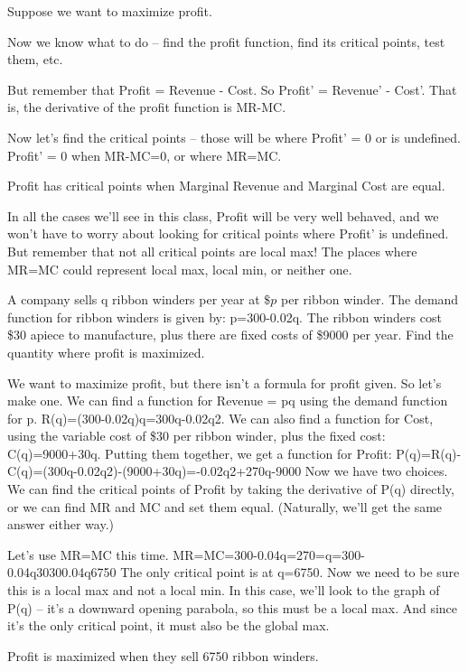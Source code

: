 \begin{example}
Suppose we want to maximize profit.

\begin{solution} Now we know what to do – find the profit function, find its critical points, test them, etc.

But remember that Profit = Revenue - Cost. So Profit' = Revenue' - Cost'. That is, the derivative of the profit function is MR-MC.

Now let’s find the critical points – those will be where Profit' = 0 or is undefined. Profit' = 0 when MR-MC=0, or where MR=MC.

Profit has critical points when Marginal Revenue and Marginal Cost are equal.
\end{solution}\end{example}

In all the cases we'll see in this class, Profit will be very well behaved, and we won't have to worry about looking for critical points where Profit' is undefined. But remember that not all critical points are local max! The places where MR=MC could represent local max, local min, or neither one.

\begin{example}
A company sells q ribbon winders per year at $\$p$ per ribbon winder. The demand function for ribbon winders is given by: p=300-0.02q. The ribbon winders cost \$30 apiece to manufacture, plus there are fixed costs of \$9000 per year. Find the quantity where profit is maximized.

\begin{solution} We want to maximize profit, but there isn’t a formula for profit given. So let's make one. We can find a function for Revenue = pq using the demand function for p.
R(q)=(300-0.02q)q=300q-0.02q2.
We can also find a function for Cost, using the variable cost of \$30 per ribbon winder, plus the fixed cost:
C(q)=9000+30q.
Putting them together, we get a function for Profit:
P(q)=R(q)-C(q)=(300q-0.02q2)-(9000+30q)=-0.02q2+270q-9000
Now we have two choices. We can find the critical points of Profit by taking the derivative of P(q) directly, or we can find MR and MC and set them equal. (Naturally, we'll get the same answer either way.)

Let's use MR=MC this time.
MR=MC=300-0.04q=270=q=300-0.04q30300.04q6750
The only critical point is at q=6750. Now we need to be sure this is a local max and not a local min. In this case, we'll look to the graph of P(q) – it's a downward opening parabola, so this must be a local max. And since it's the only critical point, it must also be the global max.

Profit is maximized when they sell 6750 ribbon winders.
\end{solution}\end{example}

